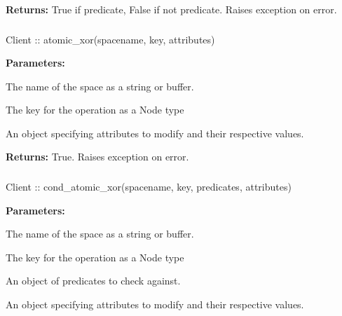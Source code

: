 \noindent\textbf{Returns:}
True if predicate, False if not predicate.  Raises exception on error.

\subsubsection{}
\label{api:nodejs:atomic_xor}
\begin{javascriptcode}
Client :: atomic_xor(spacename, key, attributes)
\end{javascriptcode}


\noindent\textbf{Parameters:}
\begin{description}[labelindent=\widthof{{\code{attributes}}},leftmargin=*,noitemsep,nolistsep,align=right]
\item[\code{spacename}] The name of the space as a string or buffer.
\item[\code{key}] The key for the operation as a Node type
\item[\code{attributes}] An object specifying attributes to modify and their respective values.
\end{description}

\noindent\textbf{Returns:}
True.  Raises exception on error.

\subsubsection{}
\label{api:nodejs:cond_atomic_xor}
\begin{javascriptcode}
Client :: cond_atomic_xor(spacename, key, predicates, attributes)
\end{javascriptcode}


\noindent\textbf{Parameters:}
\begin{description}[labelindent=\widthof{{\code{predicates}}},leftmargin=*,noitemsep,nolistsep,align=right]
\item[\code{spacename}] The name of the space as a string or buffer.
\item[\code{key}] The key for the operation as a Node type
\item[\code{predicates}] An object of predicates to check against.
\item[\code{attributes}] An object specifying attributes to modify and their respective values.
\end{description}

